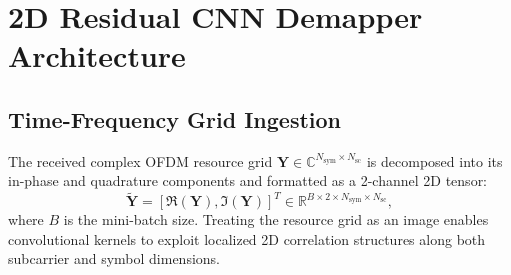 \documentclass[journal]{IEEEtran}
\begin{document}
\section{2D Residual CNN Demapper Architecture}
\label{sec:neural_demapper}

\subsection{Time-Frequency Grid Ingestion}
The received complex OFDM resource grid $\mathbf{Y} \in \mathbb{C}^{N_{\text{sym}} \times N_{\text{sc}}}$ is decomposed into its in-phase and quadrature components and formatted as a 2-channel 2D tensor:
\begin{equation}
    \tilde{\mathbf{Y}} = \left[ \Re(\mathbf{Y}), \Im(\mathbf{Y}) \right]^T \in \mathbb{R}^{B \times 2 \times N_{\text{sym}} \times N_{\text{sc}}},
\end{equation}
where $B$ is the mini-batch size. Treating the resource grid as an image enables convolutional kernels to exploit localized 2D correlation structures along both subcarrier and symbol dimensions.
\end{document}

